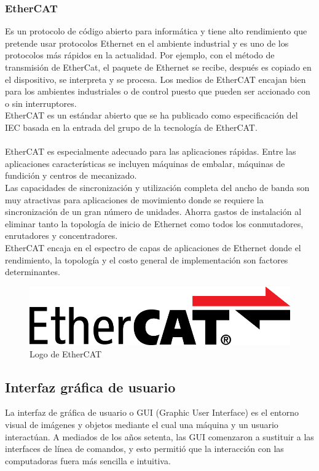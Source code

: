 \documentclass[12pt,titlepage]{article}
\begin{document}
\subsubsection{EtherCAT}
Es un protocolo de código abierto para informática y tiene alto rendimiento que pretende usar protocolos Ethernet en el ambiente industrial y es uno de los protocolos más rápidos en la actualidad. Por ejemplo, con el método de transmisión de EtherCat, el paquete de Ethernet se recibe, después es copiado en el dispositivo, se interpreta y se procesa. Los medios de EtherCAT encajan bien para los ambientes industriales o de control puesto que pueden ser accionado con o sin interruptores.\\
EtherCAT es un estándar abierto que se ha publicado como especificación del IEC basada en la entrada del grupo de la tecnología de EtherCAT. \\ \\
EtherCAT es especialmente adecuado para las aplicaciones rápidas. Entre las aplicaciones características se incluyen máquinas de embalar, máquinas de fundición y centros de mecanizado. \\[0.8mm]

Las capacidades de sincronización y utilización completa del ancho de banda son muy atractivas para aplicaciones de movimiento donde se requiere la sincronización de un gran número de unidades. Ahorra gastos de instalación al eliminar tanto la topología de  inicio de Ethernet como todos los conmutadores, enrutadores y concentradores.\\ 

EtherCAT encaja en el espectro de capas de aplicaciones de Ethernet donde el rendimiento, la topología y el costo general de implementación son factores determinantes. \\ 

\begin{figure}[htbp]
\hspace*{6.0cm} 
\includegraphics[scale=0.25]{ethercat}
\caption{Logo de EtherCAT}
\end{figure}
\newpage
\subsection{Interfaz gráfica de usuario}
La interfaz de gráfica de usuario o GUI (Graphic User Interface) es el entorno visual de imágenes y objetos mediante el cual una máquina y un usuario interactúan. A mediados de los años setenta, las GUI comenzaron a sustituir a las interfaces de línea de comandos, y esto permitió que la interacción con las computadoras fuera más sencilla e intuitiva. \\
\end{document}
